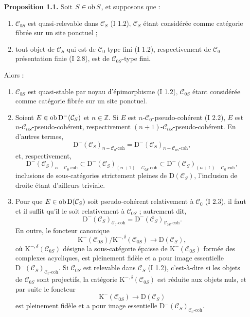 \documentclass[11pt]{article}
\begin{document}
\textbf{Proposition 1.1.} Soit $S\in\operatorname{ob} S$, et supposons que :
\begin{enumerate}[label=(\roman*)]
\item $\mathcal C_{0S}$ est quasi-relevable dans $\mathcal C_S$ (I 1.2), $\mathcal C_S$ étant considérée comme catégorie fibrée sur un site ponctuel ;
\item tout objet de $\mathcal C_S$ qui est de $\mathcal C_0$-type fini (I 1.2), respectivement de $\mathcal C_0$-présentation finie (I 2.8), est de $\mathcal C_{0S}$-type fini.
\end{enumerate}
Alors :
\begin{enumerate}[label=\alph*)]
\item $\mathcal C_{0S}$ est quasi-stable par noyau d'épimorphisme (I 1.2), $\mathcal C_{0S}$ étant considérée comme catégorie fibrée sur un site ponctuel.
\item Soient $E\in\operatorname{ob} \mathrm D^{-}(\mathcal C_S)$ et $n\in\mathbb Z$. Si $E$ est $n$-$\mathcal C_0$-pseudo-cohérent (I 2.2), $E$ est $n$-$\mathcal C_{0S}$-pseudo-cohérent, respectivement $(n+1)$-$\mathcal C_{0S}$-pseudo-cohérent. En d'autres termes,
\[
\mathrm D^{-}(\mathcal C_S)_{n-\mathcal C_0\text{-coh}}
=
\mathrm D^{-}(\mathcal C_S)_{n-\mathcal C_{0S}\text{-coh}},
\]
et, respectivement,
\[
\mathrm D^{-}(\mathcal C_S)_{n-\mathcal C_0\text{-coh}}
\subset
\mathrm D^{-}(\mathcal C_S)_{(n+1)-\mathcal C_{0S}\text{-coh}}
\subset
\mathrm D^{-}(\mathcal C_S)_{(n+1)-\mathcal C_0\text{-coh}},
\]
inclusions de sous-catégories strictement pleines de $\mathrm D(\mathcal C_S)$, l'inclusion de droite étant d'ailleurs triviale.
\item Pour que $E\in\operatorname{ob}\mathrm D(\mathcal C_S)$ soit pseudo-cohérent relativement à $\mathcal C_0$ (I 2.3), il faut et il suffit qu'il le soit relativement à $\mathcal C_{0S}$ ; autrement dit,
\[
\mathrm D^{-}(\mathcal C_S)_{\mathcal C_0\text{-coh}}
=
\mathrm D^{-}(\mathcal C_S)_{\mathcal C_{0S}\text{-coh}}.
\]
En outre, le foncteur canonique
\[
\mathrm K^{-}(\mathcal C_{0S})/\mathrm K^{-,\delta}(\mathcal C_{0S})
\longrightarrow \mathrm D(\mathcal C_S),
\]
où $\mathrm K^{-,\delta}(\mathcal C_{0S})$ désigne la sous-catégorie épaisse de $\mathrm K^{-}(\mathcal C_{0S})$ formée des complexes acycliques, est pleinement fidèle et a pour image essentielle $\mathrm D^{-}(\mathcal C_S)_{\mathcal C_0\text{-coh}}$. Si $\mathcal C_{0S}$ est relevable dans $\mathcal C_S$ (I 1.2), c'est-à-dire si les objets de $\mathcal C_{0S}$ sont projectifs, la catégorie $\mathrm K^{-,\delta}(\mathcal C_{0S})$ est réduite aux objets nuls, et par suite le foncteur
\[
\mathrm K^{-}(\mathcal C_{0S})\longrightarrow \mathrm D(\mathcal C_S)
\]
est pleinement fidèle et a pour image essentielle $\mathrm D^{-}(\mathcal C_S)_{\mathcal C_0\text{-coh}}$.
\end{enumerate}
\end{document}
